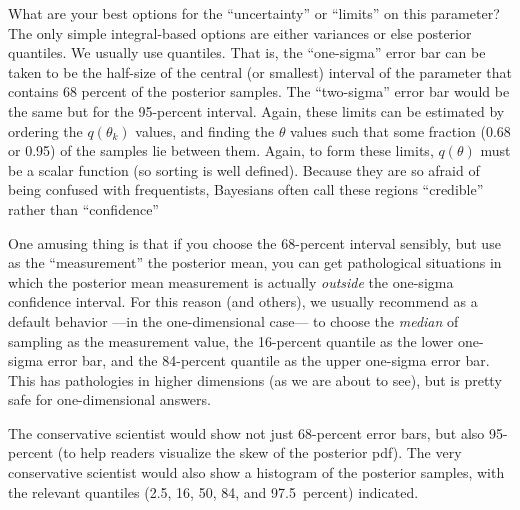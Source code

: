 \documentclass[modern]{aastex61}
\newcommand{\pars}{\theta}
\begin{document}
What are your best options for the ``uncertainty'' or ``limits'' on this parameter?
The only simple integral-based options are either variances or else posterior quantiles.
We usually use quantiles.
That is, the ``one-sigma'' error bar can be taken to be the half-size of the central (or smallest)
  interval of the parameter that contains 68 percent of the posterior
  samples.
The ``two-sigma'' error bar would be the same but for the 95-percent interval.
Again, these limits can be estimated%
  by ordering the $q(\pars_k)$ values,
  and finding the $\pars$ values such that some fraction (0.68 or 0.95)
  of the samples lie between them.
Again, to form these limits, $q(\pars)$ must be a scalar function (so sorting is well defined).
Because they are so afraid of being confused with frequentists,
Bayesians often call these regions ``credible'' rather than
``confidence''

One amusing thing is that if you choose the 68-percent interval sensibly,
  but use as the ``measurement'' the posterior mean,
  you can get pathological situations in which the posterior mean measurement
  is actually \emph{outside} the one-sigma confidence interval.
For this reason (and others), we usually recommend as a default behavior%
  ---in the one-dimensional case---%
  to choose the \emph{median} of sampling as the measurement value,
  the 16-percent quantile as the lower one-sigma error bar,
  and the 84-percent quantile as the upper one-sigma error bar.
This has pathologies in higher dimensions (as we are about to see),
  but is pretty safe for one-dimensional answers.

The conservative scientist would show not just 68-percent error bars,
  but also 95-percent
  (to help readers visualize the skew of the posterior pdf).
The very conservative scientist would also show a histogram
  of the posterior samples,
  with the relevant quantiles (2.5, 16, 50, 84, and 97.5~percent) indicated.
\end{document}
